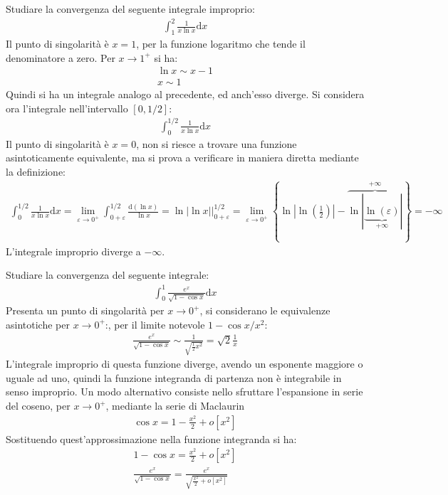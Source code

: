 \documentclass{article}
\numberwithin{equation}{subsection}
\begin{document}
Studiare la convergenza del seguente integrale improprio:
\begin{gather*}
    \displaystyle\int_1^{2}\frac{1}{x\ln x}\mathrm{d}x
\end{gather*}
Il punto di singolarità è $x=1$, per la funzione logaritmo che tende il denominatore a zero. Per $x\to1^+$ si ha:
\begin{gather*}
    \ln x\sim x-1\\
    x\sim 1
\end{gather*}
Quindi si ha un integrale analogo al precedente, ed anch'esso diverge. 
Si considera ora l'integrale nell'intervallo $[0,1/2]$:
\begin{gather*}
    \displaystyle\int_0^{1/2}\frac{1}{x\ln x}\mathrm{d}x
\end{gather*}
Il punto di singolarità è $x=0$, non si riesce a trovare una funzione asintoticamente equivalente, ma si prova a verificare in maniera diretta mediante la definizione: 
\begin{gather*}
    \displaystyle\int_0^{1/2}\frac{1}{x\ln x}\mathrm{d}x=
    \lim_{\varepsilon\to0^+}\int_{0+\varepsilon}^{1/2}\frac{\mathrm{d}(\ln x)}{\ln x}=\ln |\ln x|\bigg|_{0+\varepsilon}^{1/2}=\lim_{\varepsilon\to0^+}\left\{\ln\left|\ln\left(\frac{1}{2}\right)\right|-\overbrace{\ln|\underbrace{\ln(\varepsilon)}_{+\infty}|}^{+\infty}\right\}=-\infty
\end{gather*}
L'integrale improprio diverge a $-\infty$.


Studiare la convergenza del seguente integrale:
\begin{gather*}
    \displaystyle\int_0^1\frac{e^x}{\sqrt{1-\cos x}}\mathrm{d}x
\end{gather*}
Presenta un punto di singolarità per $x\to0^+$, si considerano le equivalenze asintotiche per $x\to0^+$:, per il limite notevole $1-\cos x/x^2$:
\begin{gather*}
    \displaystyle\frac{e^x}{\sqrt{1-\cos x}}\sim\frac{1}{\sqrt{\frac{1}{2}x^2}}=\sqrt{2}\frac{1}{x}
\end{gather*}
L'integrale improprio di questa funzione diverge, avendo un esponente maggiore o uguale ad uno, quindi la funzione integranda di partenza non è integrabile in senso improprio. 
Un modo alternativo consiste nello sfruttare l'espansione in serie del coseno, per $x\to0^+$, mediante la serie di Maclaurin
\begin{gather*}
    \cos x=1-\displaystyle\frac{x^2}{2}+o[x^2]
\end{gather*}
Sostituendo quest'approssimazione nella funzione integranda si ha:
\begin{gather*}
    1-\cos x=\displaystyle\frac{x^2}{2}+o[x^2]\\
    \displaystyle\frac{e^x}{\sqrt{1-\cos x}}=\frac{e^x}{\sqrt{\frac{x^2}{2}+o[x^2]}}
\end{gather*}
\end{document}
